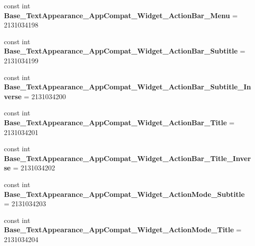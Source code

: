 \begin{DoxyCompactItemize}
\item 
\hypertarget{classClient_1_1Droid_1_1Resource_1_1Style_a7f6a9a556dd3e35e81ad195f8529e25f}{}const int {\bfseries Base\+\_\+\+Text\+Appearance\+\_\+\+App\+Compat\+\_\+\+Widget\+\_\+\+Action\+Bar\+\_\+\+Menu} = 2131034198\label{classClient_1_1Droid_1_1Resource_1_1Style_a7f6a9a556dd3e35e81ad195f8529e25f}

\item 
\hypertarget{classClient_1_1Droid_1_1Resource_1_1Style_ab7803c5d79b71010a312063b16b60e0b}{}const int {\bfseries Base\+\_\+\+Text\+Appearance\+\_\+\+App\+Compat\+\_\+\+Widget\+\_\+\+Action\+Bar\+\_\+\+Subtitle} = 2131034199\label{classClient_1_1Droid_1_1Resource_1_1Style_ab7803c5d79b71010a312063b16b60e0b}

\item 
\hypertarget{classClient_1_1Droid_1_1Resource_1_1Style_a07e9f1a107ebd1e3d79202d6a07e6ed4}{}const int {\bfseries Base\+\_\+\+Text\+Appearance\+\_\+\+App\+Compat\+\_\+\+Widget\+\_\+\+Action\+Bar\+\_\+\+Subtitle\+\_\+\+Inverse} = 2131034200\label{classClient_1_1Droid_1_1Resource_1_1Style_a07e9f1a107ebd1e3d79202d6a07e6ed4}

\item 
\hypertarget{classClient_1_1Droid_1_1Resource_1_1Style_a63e66cc767e10bcb9f864fcbf693ff7f}{}const int {\bfseries Base\+\_\+\+Text\+Appearance\+\_\+\+App\+Compat\+\_\+\+Widget\+\_\+\+Action\+Bar\+\_\+\+Title} = 2131034201\label{classClient_1_1Droid_1_1Resource_1_1Style_a63e66cc767e10bcb9f864fcbf693ff7f}

\item 
\hypertarget{classClient_1_1Droid_1_1Resource_1_1Style_a613191ef6ce506512e56df2afe418b38}{}const int {\bfseries Base\+\_\+\+Text\+Appearance\+\_\+\+App\+Compat\+\_\+\+Widget\+\_\+\+Action\+Bar\+\_\+\+Title\+\_\+\+Inverse} = 2131034202\label{classClient_1_1Droid_1_1Resource_1_1Style_a613191ef6ce506512e56df2afe418b38}

\item 
\hypertarget{classClient_1_1Droid_1_1Resource_1_1Style_a9b6b213ccd12e8c2b96ae0fca1584a26}{}const int {\bfseries Base\+\_\+\+Text\+Appearance\+\_\+\+App\+Compat\+\_\+\+Widget\+\_\+\+Action\+Mode\+\_\+\+Subtitle} = 2131034203\label{classClient_1_1Droid_1_1Resource_1_1Style_a9b6b213ccd12e8c2b96ae0fca1584a26}

\item 
\hypertarget{classClient_1_1Droid_1_1Resource_1_1Style_a4cc6184da4a63fc7b907851cdf9f6d79}{}const int {\bfseries Base\+\_\+\+Text\+Appearance\+\_\+\+App\+Compat\+\_\+\+Widget\+\_\+\+Action\+Mode\+\_\+\+Title} = 2131034204\label{classClient_1_1Droid_1_1Resource_1_1Style_a4cc6184da4a63fc7b907851cdf9f6d79}


\end{DoxyCompactItemize}
